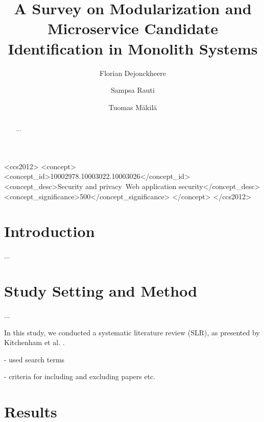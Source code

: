 \documentclass[sigconf]{acmart}
\begin{document}
	\title{A Survey on Modularization and Microservice Candidate Identification in Monolith Systems}

	\author{Florian Dejonckheere}
	\affiliation{
		\institution{}
		\city{}
		\country{}
	}

	\author{Sampsa Rauti}

	\author{Tuomas Mäkilä}

	\begin{abstract}
		...
	\end{abstract}

	\begin{CCSXML}
		<ccs2012>
		<concept>
		<concept_id>10002978.10003022.10003026</concept_id>
		<concept_desc>Security and privacy~Web application security</concept_desc>
		<concept_significance>500</concept_significance>
		</concept>
		</ccs2012>
	\end{CCSXML}



	\maketitle

	\section{Introduction}

	...

	\section{Study Setting and Method}

	...

	In this study, we conducted a systematic literature review (SLR), as presented by Kitchenham et al. \cite{kitchenham2004}.

	- used search terms

	- criteria for including and excluding papers etc.

	\section{Results}
\end{document}

